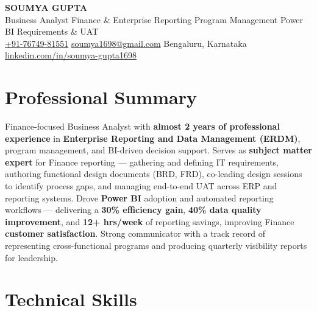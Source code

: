 \documentclass[10pt, letterpaper]{article}
\begin{document}

\begin{center}
  {\LARGE\bfseries SOUMYA GUPTA}\\[2pt]
  {\small\color{muted}Business Analyst \textbar{} Finance \& Enterprise Reporting \textbar{} Program Management \textbar{} Power BI \textbar{} Requirements \& UAT}\\[3pt]
  {\small
  \href{tel:+917674981551}{+91-76749-81551}\enspace\textbullet\enspace
  \href{mailto:soumya1698@gmail.com}{soumya1698@gmail.com}\enspace\textbullet\enspace
  Bengaluru, Karnataka\enspace\textbullet\enspace
  \href{https://linkedin.com/in/soumya-gupta1698}{linkedin.com/in/soumya-gupta1698}}
\end{center}

\vspace{-2pt}

\section{Professional Summary}

Finance-focused Business Analyst with \textbf{almost 2 years of professional experience} in \textbf{Enterprise Reporting and Data Management (ERDM)}, program management, and BI-driven decision support. Serves as \textbf{subject matter expert} for Finance reporting — gathering and defining IT requirements, authoring functional design documents (BRD, FRD), co-leading design sessions to identify process gaps, and managing end-to-end UAT across ERP and reporting systems. Drove \textbf{Power BI} adoption and automated reporting workflows — delivering a \textbf{30\% efficiency gain}, \textbf{40\% data quality improvement}, and \textbf{12+ hrs/week} of reporting savings, improving Finance \textbf{customer satisfaction}. Strong communicator with a track record of representing cross-functional programs and producing quarterly visibility reports for leadership.

\section{Technical Skills}
\end{document}
